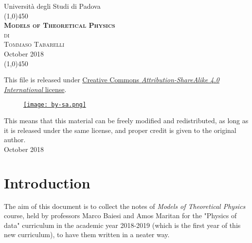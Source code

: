\documentclass[12pt, english, a4paper]{book}
\begin{document}
\begin{titlepage}

\begin{center}
\LARGE{Università degli Studi di Padova}\\
\line(1,0){450}\\
\vspace{10em}
\Huge{\textsc{\textbf{Models of Theoretical Physics}}}\\
\vspace{4em}
\LARGE{\textsc{di}}\\
\vspace{3em}
\huge{\textsc{Tommaso Tabarelli}}\\
\vspace{10em}
\LARGE{October 2018}\\
\line(1,0){450}
\end{center}

\end{titlepage}
\let\cleardoublepage\clearpage

\thispagestyle{empty}
\null
\vfill
\begin{center}
\small{This file is released under \href{http://creativecommons.org/licenses/by-sa/4.0/}{\color{blue}Creative Commons \emph{Attribution-ShareAlike 4.0 International} license}.}
\begin{figure}[H]
\centering
\href{http://creativecommons.org/licenses/by-nc-sa/4.0/deed.it}{\texttt{[image: by-sa.png]}}
\end{figure}
\vspace{0.5em}
This means that this material can be freely modified and redistributed, as long as it is released under the same license, and proper credit is given to the original author.\\

\vspace{2em}
\scriptsize{October 2018}
\end{center}

\newpage
\thispagestyle{empty}
\chapter*{Introduction}
The aim of this document is to collect the notes of \textit{Models of Theoretical Physics} course, held by professors Marco Baiesi and Amos Maritan for the "Physics of data" curriculum in the academic year 2018-2019 (which is the first year of this new curriculum), to have them written in a neater way.
\end{document}
